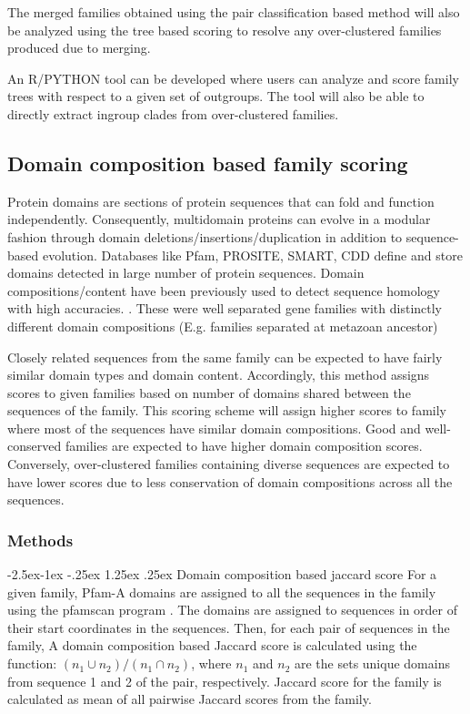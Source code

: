 \documentclass{article}
\makeatletter
\renewcommand\paragraph{\@startsection{paragraph}{4}{\z@}%
	{-2.5ex\@plus -1ex \@minus -.25ex}%
	{1.25ex \@plus .25ex}%
	{\normalfont\normalsize\bfseries}}
\makeatother
\begin{document}
		The merged families obtained using the pair classification based method will also be analyzed using the tree based scoring to resolve any over-clustered families produced due to merging.
		
		An R/PYTHON tool can be developed where users can analyze and score family trees with respect to a given set of outgroups. The tool will also be able to directly extract ingroup clades from over-clustered families.
		\pagebreak
		
	\subsection{Domain composition based family scoring}
	Protein domains are sections of protein sequences that can fold and function independently. Consequently, multidomain proteins can evolve in a modular fashion through domain deletions/insertions/duplication in addition to sequence-based evolution. Databases like Pfam, PROSITE, SMART, CDD \citep{finn2007pfam,falquet2002prosite,letunic2011smart,marchler2010cdd} define and store domains detected in large number of protein sequences. Domain compositions/content have been previously used to detect sequence homology with high accuracies. \citep{song2007domain,bitard2015domain}. These were well separated gene families with distinctly different domain compositions (E.g. families separated at metazoan ancestor)
	
	Closely related sequences from the same family can be expected to have fairly similar domain types and domain content. Accordingly, this method assigns scores to given families based on number of domains shared between the sequences of the family. This scoring scheme will assign higher scores to family where most of the sequences have similar domain compositions. Good and well-conserved families are expected to have higher domain composition scores. Conversely, over-clustered families containing diverse sequences are expected to have lower scores due to less conservation of domain compositions across all the sequences.
	
	\subsubsection{Methods}
		\paragraph{Domain composition based jaccard score}
		For a given family, Pfam-A domains are assigned to all the sequences in the family using the pfamscan program \citep{mistry2007predicting}. The domains are assigned  to sequences in order of their start coordinates in the sequences. Then, for each pair of sequences in the family, A domain composition based Jaccard score is calculated using the function: $(n_1 \cup  n_2)/(n_1 \cap n_2)$, where $n_1$ and $n_2$ are the sets unique domains from sequence 1 and 2 of the pair, respectively. Jaccard score for the family is calculated as mean of all pairwise Jaccard scores from the family.
		
\end{document}
